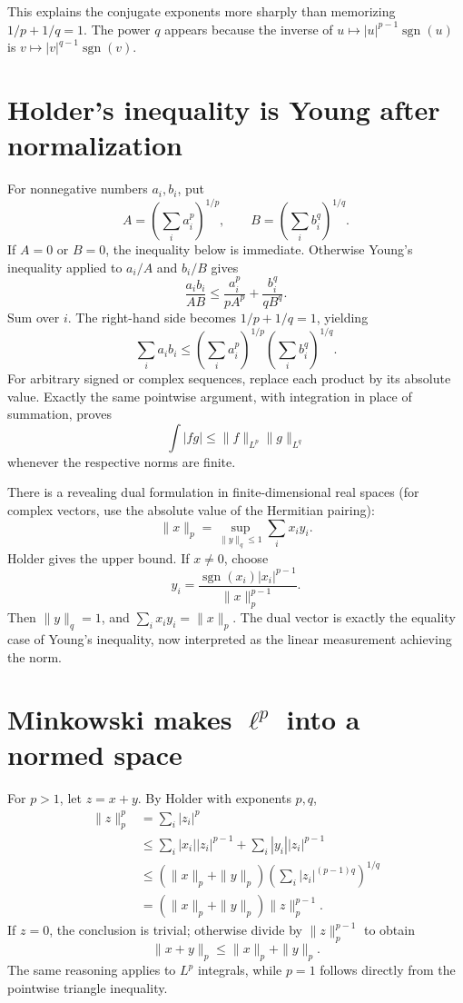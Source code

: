 This explains the conjugate exponents more sharply than memorizing \(1/p+1/q=1\). The power \(q\) appears because the inverse of \(u\mapsto |u|^{p-1}\operatorname{sgn}(u)\) is \(v\mapsto |v|^{q-1}\operatorname{sgn}(v)\).

\section{Holder's inequality is Young after normalization}

For nonnegative numbers \(a_i,b_i\), put
\[
 A=\left(\sum_i a_i^p\right)^{1/p},\qquad
 B=\left(\sum_i b_i^q\right)^{1/q}.
\]
If \(A=0\) or \(B=0\), the inequality below is immediate. Otherwise Young's inequality applied to \(a_i/A\) and \(b_i/B\) gives
\[
 \frac{a_ib_i}{AB}
 \le\frac{a_i^p}{pA^p}+\frac{b_i^q}{qB^q}.
\]
Sum over \(i\). The right-hand side becomes \(1/p+1/q=1\), yielding
\[
 \boxed{\sum_i a_ib_i\le
 \left(\sum_i a_i^p\right)^{1/p}
 \left(\sum_i b_i^q\right)^{1/q}.}
\]
For arbitrary signed or complex sequences, replace each product by its absolute value. Exactly the same pointwise argument, with integration in place of summation, proves
\[
 \int|fg|\le\|f\|_{L^p}\|g\|_{L^q}
\]
whenever the respective norms are finite.

There is a revealing dual formulation in finite-dimensional real spaces (for complex vectors, use the absolute value of the Hermitian pairing):
\[
 \boxed{\|x\|_p=\sup_{\|y\|_q\le1}\sum_i x_i y_i.}
\]
Holder gives the upper bound. If \(x\ne0\), choose
\[
 y_i=\frac{\operatorname{sgn}(x_i)|x_i|^{p-1}}{\|x\|_p^{p-1}}.
\]
Then \(\|y\|_q=1\), and \(\sum_i x_iy_i=\|x\|_p\). The dual vector is exactly the equality case of Young's inequality, now interpreted as the linear measurement achieving the norm.

\section[Minkowski and the p-norm]{Minkowski makes \(\ell^p\) into a normed space}

For \(p>1\), let \(z=x+y\). By Holder with exponents \(p,q\),
\[
\begin{aligned}
 \|z\|_p^p
 &=\sum_i|z_i|^p\\
 &\le\sum_i |x_i||z_i|^{p-1}
       +\sum_i|y_i||z_i|^{p-1}\\
 &\le(\|x\|_p+\|y\|_p)
       \left(\sum_i|z_i|^{(p-1)q}\right)^{1/q}\\
 &=(\|x\|_p+\|y\|_p)\|z\|_p^{p-1}.
\end{aligned}
\]
If \(z=0\), the conclusion is trivial; otherwise divide by \(\|z\|_p^{p-1}\) to obtain
\[
 \boxed{\|x+y\|_p\le\|x\|_p+\|y\|_p.}
\]
The same reasoning applies to \(L^p\) integrals, while \(p=1\) follows directly from the pointwise triangle inequality.

